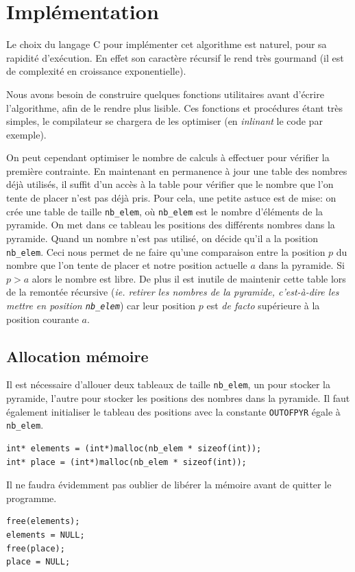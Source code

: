 \documentclass[10pt]{article}%
\begin{document}
\section{Implémentation}
  Le choix du langage C pour implémenter cet algorithme est naturel, pour sa rapidité d'exécution.
  En effet son caractère récursif le rend très gourmand (il est de complexité en croissance exponentielle).

  Nous avons besoin de construire quelques fonctions utilitaires avant d'écrire l'algorithme, afin de le rendre plus lisible.
  Ces fonctions et procédures étant très simples, le compilateur se chargera de les optimiser 
  (en \textit{inlinant} le code par exemple).

  On peut cependant optimiser le nombre de calculs à effectuer pour vérifier la première contrainte.
  En maintenant en permanence à jour une table des nombres déjà utilisés, il suffit d'un accès à
  la table pour vérifier que le nombre que l'on tente de placer n'est pas déjà pris.
  Pour cela, une petite astuce est de mise: on crée une table de taille \texttt{nb\_elem}, où
  \texttt{nb\_elem} est le nombre d'éléments de la pyramide. On met dans ce tableau les positions
  des différents nombres dans la pyramide. Quand un nombre n'est pas utilisé, on décide qu'il a la position
  \texttt{nb\_elem}. Ceci nous permet de ne faire qu'une comparaison entre la position $p$ du nombre que l'on tente
  de placer et notre position actuelle $a$ dans la pyramide. Si $p > a$ alors le nombre est libre.
  De plus il est inutile de maintenir cette table lors de la remontée récursive (\textit{ie. retirer les nombres
  de la pyramide, c'est-à-dire les mettre en position \texttt{nb\_elem}}) car leur position $p$ est \textit{de facto} supérieure
  à la position courante $a$.

\subsection*{Allocation mémoire}
  Il est nécessaire d'allouer deux tableaux de taille \texttt{nb\_elem}, un pour stocker la pyramide,
  l'autre pour stocker les positions des nombres dans la pyramide. Il faut également initialiser
  le tableau des positions avec la constante \texttt{OUTOFPYR} égale à \texttt{nb\_elem}.
  \begin{verbatim}
int* elements = (int*)malloc(nb_elem * sizeof(int));
int* place = (int*)malloc(nb_elem * sizeof(int));
  \end{verbatim}

  Il ne faudra évidemment pas oublier de libérer la mémoire avant de quitter le programme.
  \begin{verbatim}
free(elements);
elements = NULL;
free(place);
place = NULL;
  \end{verbatim}
\end{document}
